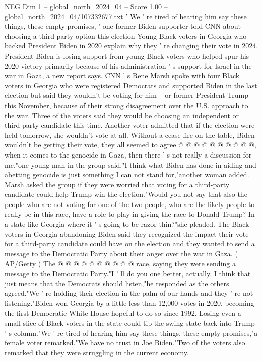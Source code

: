 \begin{textsample}{NEG Dim 1 – global\_north\_2024\_04 – Score 1.00 – global\_north\_2024\_04/107332677.txt}  \label{ex:f1_neg_254}
' We ' re tired of hearing him say these things, these empty promises, ' one former Biden supporter told CNN about choosing a third-party option this election Young Black voters in Georgia who backed President Biden in 2020 explain why they ' re changing their vote in 2024.
President Biden is losing support from young Black voters who helped spur his 2020 victory primarily because of his administration ' s support for Israel in the war in Gaza, a new report says.
CNN ' s Rene Marsh spoke with four Black voters in Georgia who were registered Democrats and supported Biden in the last election but said they wouldn't be voting for him -- or former President Trump -- this November, because of their strong disagreement over the U.S. approach to the war.
Three of the voters said they would be choosing an independent or third-party candidate this time.
Another voter admitted that if the election were held tomorrow, she wouldn't vote at all.
Without a cease-fire on the table, Biden wouldn't be getting their vote, they all seemed to agree @ @ @ @ @ @ @ @ @ @, when it comes to the genocide in Gaza, then there ' s not really a discussion for me,"one young man in the group said."I think what Biden has done in aiding and abetting genocide is just something I can not stand for,"another woman added.
Marsh asked the group if they were worried that voting for a third-party candidate could help Trump win the election."Would you not say that also the people who are not voting for one of the two people, who are the likely people to really be in this race, have a role to play in giving the race to Donald Trump?
In a state like Georgia where it ' s going to be razor-thin?"she pleaded.
The Black voters in Georgia abandoning Biden said they recognized the impact their vote for a third-party candidate could have on the election and they wanted to send a message to the Democratic Party about their anger over the war in Gaza. ( AP/Getty ) The @ @ @ @ @ @ @ @ @ @ race, saying they were sending a message to the Democratic Party."I ' ll do you one better, actually.
I think that just means that the Democrats should listen,"he responded as the others agreed."We ' re holding their election in the palm of our hands and they ' re not listening."Biden won Georgia by a little less than 12,000 votes in 2020, becoming the first Democratic White House hopeful to do so since 1992.
Losing even a small slice of Black voters in the state could tip the swing state back into Trump ' s column."We ' re tired of hearing him say these things, these empty promises,"a female voter remarked."We have no trust in Joe Biden."Two of the voters also remarked that they were struggling in the current economy.

\end{textsample}
